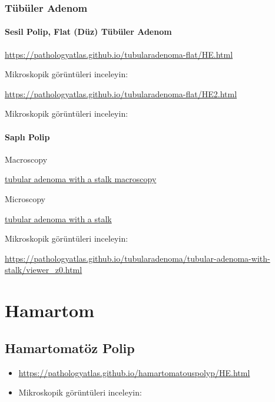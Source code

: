 \documentclass[
  letterpaper,
  DIV=11,
  numbers=noendperiod]{scrreprt}
\begin{document}
\hypertarget{tuxfcbuxfcler-adenom}{%
\subsection{Tübüler Adenom}\label{tuxfcbuxfcler-adenom}}

\hypertarget{sesil-polip-flat-duxfcz-tuxfcbuxfcler-adenom}{%
\subsubsection{Sesil Polip, Flat (Düz) Tübüler
Adenom}\label{sesil-polip-flat-duxfcz-tuxfcbuxfcler-adenom}}

\url{https://pathologyatlas.github.io/tubularadenoma-flat/HE.html}

Mikroskopik görüntüleri inceleyin:

\url{https://pathologyatlas.github.io/tubularadenoma-flat/HE2.html}

Mikroskopik görüntüleri inceleyin:

\hypertarget{saplux131-polip}{%
\subsubsection{Saplı Polip}\label{saplux131-polip}}

Macroscopy

\href{https://pathologyatlas.github.io/tubularadenoma/tubular-adenoma-with-stalk-macroscopy.jpg}{tubular
adenoma with a stalk macroscopy}

Microscopy

\href{https://pathologyatlas.github.io/tubularadenoma/tubular-adenoma-with-stalk.jpeg}{tubular
adenoma with a stalk}

Mikroskopik görüntüleri inceleyin:

\url{https://pathologyatlas.github.io/tubularadenoma/tubular-adenoma-with-stalk/viewer_z0.html}

\hypertarget{hamartom}{%
\chapter{Hamartom}\label{hamartom}}

\hypertarget{hamartomatuxf6z-polip}{%
\section{Hamartomatöz Polip}\label{hamartomatuxf6z-polip}}

\begin{itemize}
\item
  \url{https://pathologyatlas.github.io/hamartomatouspolyp/HE.html}
\item
  Mikroskopik görüntüleri inceleyin:
\end{itemize}
\end{document}
